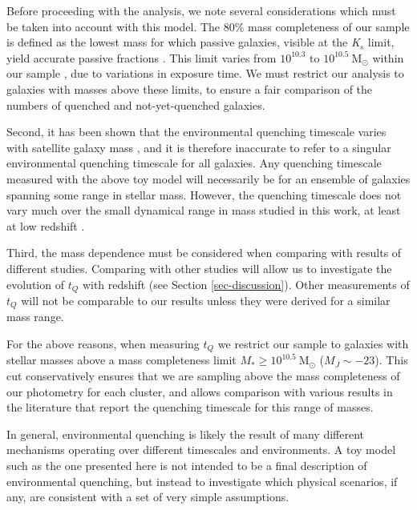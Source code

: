 Before proceeding with the analysis, we note several considerations which must be taken into account with this model.
The $80\%$ mass completeness of our sample is defined as the lowest mass for which passive galaxies, visible at the \textit{K$_s$} limit, yield accurate passive fractions \citep{van-der-Burg:2013zn}.
This limit varies from $10^{10.3}$ to $10^{10.5}\ \mathrm{M}_\odot$ within our sample \citep{van-der-Burg:2013zn,Nantais:2017aa}, due to variations in exposure time.
We must restrict our analysis to galaxies with masses above these limits, to ensure a fair comparison of the numbers of quenched and not-yet-quenched galaxies.

Second, it has been shown that the environmental quenching timescale varies with satellite galaxy mass \citep{De-Lucia:2012aa,Wetzel:2013aa,Wheeler:2014aa,Fillingham:2015aa}, and it is therefore inaccurate to refer to a singular environmental quenching timescale for all galaxies.
Any quenching timescale measured with the above toy model will necessarily be for an ensemble of galaxies spanning some range in stellar mass.
However, the quenching timescale does not vary much over the small dynamical range in mass studied in this work, at least at low redshift \citep[e.g. see Fig. 8 of ][Figure 5]{Fillingham:2015aa,Wetzel:2013aa}.

Third, the mass dependence must be considered when comparing with results of different studies.
Comparing with other studies will allow us to investigate the evolution of $t_Q$ with redshift (see Section \ref{sec-discussion}).
Other measurements of $t_Q$ will not be comparable to our results unless they were derived for a similar mass range.

For the above reasons, when measuring $t_Q$ we restrict our sample to galaxies with stellar masses above a mass completeness limit $M_* \ge 10^{10.5}~ \mathrm{M}_\odot$ ($M_J\sim-23$).
This cut conservatively ensures that we are sampling above the mass completeness of our photometry for each cluster, and allows comparison with various results in the literature that report the quenching timescale for this range of masses.

In general, environmental quenching is likely the result of many different mechanisms operating over different timescales and environments.
A toy model such as the one presented here is not intended to be a final description of environmental quenching, but instead to investigate which physical scenarios, if any, are consistent with a set of very simple assumptions.

